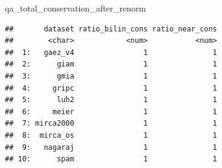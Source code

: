 \documentclass[
  11pt,
]{article}
\newenvironment{Shaded}{\begin{snugshade}}{\end{snugshade}}
\newcommand{\NormalTok}[1]{#1}
\begin{document}
\begin{Shaded}
\begin{Highlighting}[]
\NormalTok{qa\_total\_conservation\_after\_renorm}
\end{Highlighting}
\end{Shaded}

\begin{verbatim}
##       dataset ratio_bilin_cons ratio_near_cons
##        <char>            <num>           <num>
##  1:   gaez_v4                1               1
##  2:      giam                1               1
##  3:      gmia                1               1
##  4:     gripc                1               1
##  5:      luh2                1               1
##  6:     meier                1               1
##  7: mirca2000                1               1
##  8:  mirca_os                1               1
##  9:   nagaraj                1               1
## 10:      spam                1               1
\end{verbatim}
\end{document}
